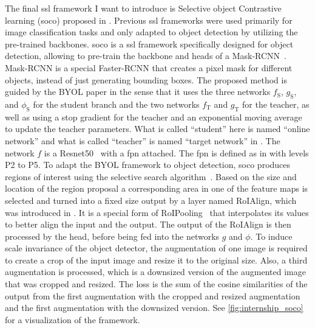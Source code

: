 The final \acrshort{ssl} framework I want to introduce is Selective object Contrastive learning (\acrshort{soco}) proposed in \cite{Wei:2021aaa}. Previous \acrshort{ssl} frameworks were used primarily for image classification tasks and only adapted to object detection by utilizing the pre-trained backbones. \acrshort{soco} is a \acrshort{ssl} framework specifically designed for object detection, allowing to pre-train the backbone and heads of a Mask-RCNN~\cite{He:2017aaa}. Mask-RCNN is a special Faster-RCNN that creates a pixel mask for different objects, instead of just generating bounding boxes. The proposed method is guided by the BYOL paper in the sense that it uses the three networks $f_\text{S}$, $g_\text{S}$, and $\phi_\text{S}$ for the student branch and the two networks $f_\text{T}$ and $g_\text{T}$ for the teacher, as well as using a stop gradient for the teacher and an exponential moving average to update the teacher parameters. What is called ``student'' here is named ``online network'' and what is called ``teacher'' is named ``target network'' in \cite{Wei:2021aaa}. The network $f$ is a Resnet50~\cite{He:2015aaa} with a \acrshort{fpn} attached. The \acrshort{fpn} is defined as in \cite{Lin:2017aaa} with levels P2 to P5. To adapt the BYOL framework to object detection, \acrshort{soco} produces regions of interest using the selective search algorithm~\cite{Uijlings:2013aaa}. Based on the size and location of the region proposal a corresponding area in one of the feature maps is selected and turned into a fixed size output by a layer named RoIAlign, which was introduced in \cite{He:2017aaa}. It is a special form of RoIPooling~\cite{Girshick:2015aaa} that interpolates its values to better align the input and the output. The output of the RoIAlign is then processed by the head, before being fed into the networks $g$ and $\phi$. To induce scale invariance of the object detector, the augmentation of one image is required to create a crop of the input image and resize it to the original size. Also, a third augmentation is processed, which is a downsized version of the augmented image that was cropped and resized. The loss is the sum of the cosine similarities of the output from the first augmentation with the cropped and resized augmentation and the first augmentation with the downsized version. See \autoref{fig:internship_soco} for a visualization of the framework.
